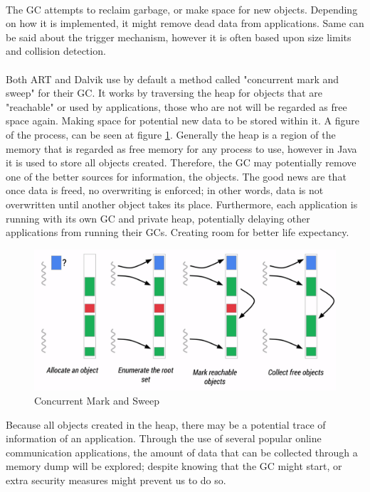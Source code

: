 \\
The GC attempts to reclaim garbage, or make space for new objects. Depending on how it is implemented, it might remove dead data from applications. Same can be said about the trigger mechanism, however it is often based upon size limits and collision detection.\\
\\
Both ART and Dalvik use by default a method called "concurrent mark and sweep" for their GC\cite{ARTGC,DALVIKGC}. It works by traversing the heap for objects that are "reachable" or used by applications, those who are not will be regarded as free space again. Making space for potential new data to be stored within it. A figure of the process, can be seen at figure \ref{fig:mas}. Generally the heap is a region of the memory that is regarded as free memory for any process to use, however in Java it is used to store all objects created. Therefore, the GC may potentially remove one of the better sources for information, the objects. The good news are that once data is freed, no overwriting is enforced; in other words, data is not overwritten until another object takes its place\cite{DALVIKGC}. Furthermore, each application is running with its own GC and private heap, potentially delaying other applications from running their GCs.\cite{AndroidMemManagement} Creating room for better life expectancy.

\begin{figure}[h]
  \includegraphics[width=0.5 \textwidth]{figures/gc}
  \caption{Concurrent Mark and Sweep\cite{ARTGC}}
  \label{fig:mas}
\end{figure}

Because all objects created in the heap, there may be a potential trace of information of an application. Through the use of several popular online communication applications, the amount of data that can be collected through a memory dump will be explored; despite knowing that the GC might start, or extra security measures might prevent us to do so.

